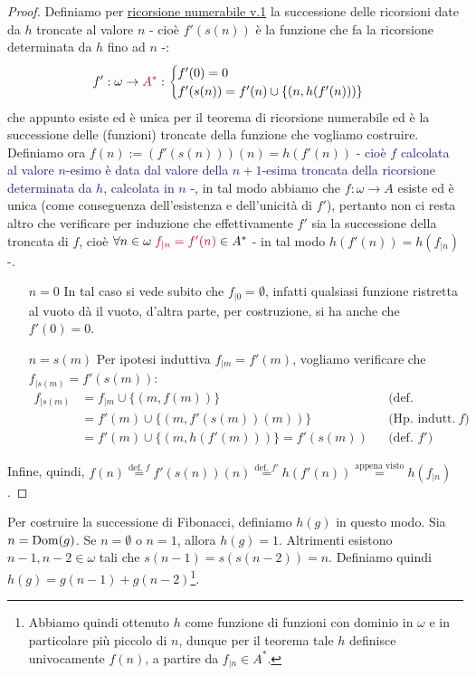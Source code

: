 \begin{proof}
	Definiamo per \hyperref[ric1]{ricorsione numerabile v.1} la successione delle ricorsioni date da $h$ troncate al valore $n$ - cioè $f'(s(n))$ è la funzione che fa la ricorsione determinata da $h$ fino ad $n$ -:
	\[ f' : \omega \to \textcolor{purple}{A^*} : \begin{cases}
		f'(0) = 0 \\
		f'(s(n)) = f'(n) \cup \{(n,h(f'(n)))\}
	\end{cases}
		\]
	che appunto esiste ed è unica per il teorema di ricorsione numerabile ed è la successione delle (funzioni) troncate della funzione che vogliamo costruire. \\
	Definiamo ora $f(n) := (f'(s(n)))(n) = h(f'(n))$ \textcolor{MidnightBlue}{- cioè $f$ calcolata al valore $n$-esimo è data dal valore della $n+1$-esima troncata della ricorsione determinata da $h$, calcolata in $n$ -}, in tal modo abbiamo che $f : \omega \to A$ esiste ed è unica (come conseguenza dell'esistenza e dell'unicità di $f'$), pertanto non ci resta altro che verificare per induzione
	che effettivamente $f'$ sia la successione della troncata di $f$, cioè $\forall n \in \omega \; \textcolor{purple}{f_{|n} = f'(n)} \in A^*$ - in tal modo $h(f'(n)) = h(f_{|n})$ -.
	\begin{itemize}
		\item[$\boxed{n = 0}$] In tal caso si vede subito che $f_{|0} = \emptyset$, infatti qualsiasi funzione ristretta al vuoto dà il vuoto, d'altra parte, per costruzione, si ha anche che $f'(0) = 0$.
		\item[$\boxed{n = s(m)}$] Per ipotesi induttiva $f_{|m} = f'(m)$, vogliamo verificare che $f_{|s(m)} = f'(s(m))$:
		\begin{align*}
			f_{|s(m)} &= f_{|m} \cup \{(m,f(m))\} &&\text{(def. funzione)}\\
					  &= f'(m) \cup \{(m,f'(s(m))(m))\} &&\text{(Hp. indutt. + def. $f$)}\\
					  &= f'(m) \cup \{(m,h(f'(m)))\} = f'(s(m)) &&\text{(def. $f'$)}
		\end{align*}
	\end{itemize}
	Infine, quindi, $f(n) \overset{\text{def. $f$}}{=} f'(s(n))(n) \overset{\text{def. $f'$}}{=} h(f'(n)) \overset{\text{appena visto}}{=} h(f_{|n})$.
\end{proof}

\begin{example}
	Per costruire la successione di Fibonacci, definiamo $h(g)$ in questo modo. Sia $n = \operatorname{Dom}(g)$. Se $n = \emptyset$ o $n = 1$, allora $h(g) = 1$.
	Altrimenti esistono $n-1, n-2 \in \omega$ tali che $s(n-1) = s(s(n-2)) = n$. Definiamo quindi $h(g) = g(n-1) + g(n-2)$\footnote{Abbiamo quindi ottenuto $h$ come funzione di funzioni con dominio in $\omega$ e in particolare più piccolo di $n$, dunque per il teorema tale $h$ definisce univocamente $f(n)$, a partire da $f_{|n} \in A^*$.}.
\end{example}

